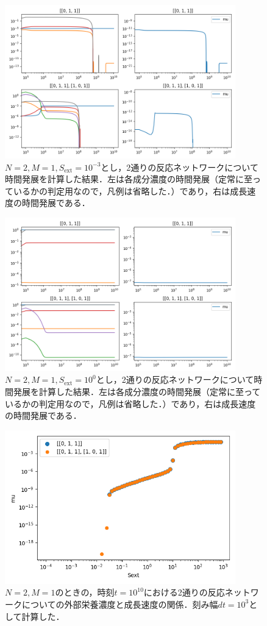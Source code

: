 \documentclass[a4paper,11pt]{jsarticle}
\begin{document}
\begin{figure}[htbp]
  \centering
  \includegraphics[width=10cm]{himeoka_timser_N2_M1_TMAX10_div7_NPLT5_Sext-3.png}
  \caption{$N=2,M=1,S_{\mathrm{ext}}=10^{-3}$とし，2通りの反応ネットワークについて時間発展を計算した結果．左は各成分濃度の時間発展（定常に至っているかの判定用なので，凡例は省略した．）であり，右は成長速度の時間発展である．}
  \label{fig:N2M1S-3}
\end{figure}

\begin{figure}[htbp]
  \centering
  \includegraphics[width=10cm]{himeoka_timser_N2_M1_TMAX10_div7_NPLT5_Sext0.png}
  \caption{$N=2,M=1,S_{\mathrm{ext}}=10^{0}$とし，2通りの反応ネットワークについて時間発展を計算した結果．左は各成分濃度の時間発展（定常に至っているかの判定用なので，凡例は省略した．）であり，右は成長速度の時間発展である．}
  \label{fig:N2M1S0}
\end{figure}

\begin{figure}[htbp]
  \centering
  \includegraphics[width=10cm]{himeoka_trans_N2_M1_TMAX10_div7.png}
  \caption{$N=2,M=1$のときの，時刻$t=10^{10}$における2通りの反応ネットワークについての外部栄養濃度と成長速度の関係．刻み幅$dt=10^3$として計算した．}
  \label{fig:N2M1}
\end{figure}
\end{document}
